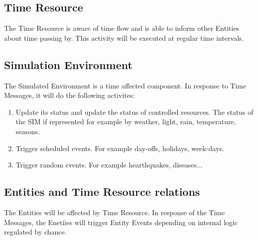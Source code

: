 \subsection{Time Resource} 
The Time Resource is aware of time flow and is able to inform other Entities about time passing by. This activity will be executed at regular time intervals.

\subsection{Simulation Environment} 
The Simulated Environment is a time affected component. In response to Time Messages, it will do the following activites:

\begin{enumerate}
 \item Update its status and update the status of controlled resources. The status of the SIM if represented for example by weather, light, rain, temperature, seasons.
 \item Trigger scheduled events. For example day-offs, holidays, week-days.
 \item Trigger random events. For example hearthquakes, diseases...
\end{enumerate}


\subsection{Entities and Time Resource relations} 
The Entities will be affected by Time Resource. In response of the Time Messages, the Enetiies will trigger Entity Events depending on internal logic regulated by chance.

